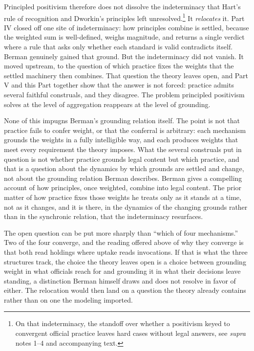 Principled positivism therefore does not dissolve the indeterminacy that
Hart's rule of recognition and Dworkin's principles left unresolved.\footnote{On that indeterminacy, the standoff over whether a positivism keyed to convergent official practice leaves hard cases without legal answers, see \textit{supra} notes 1--4 and accompanying text.} It
\textit{relocates} it. Part IV closed off one site of indeterminacy: how
principles combine is settled, because the weighted sum is well-defined,
weighs magnitude, and returns a single verdict where a rule that asks
only whether each standard is valid contradicts itself. Berman genuinely
gained that ground. But the indeterminacy did not vanish. It moved upstream, to the question of
which practice fixes the weights that the settled machinery then combines. That
question the theory leaves open, and Part V and this Part together show
that the answer is not forced: practice admits several faithful
construals, and they disagree. The problem principled positivism solves at the level of aggregation
reappears at the level of grounding.

None of this impugns Berman's grounding relation itself. The point is not
that practice fails to confer weight, or that the conferral is arbitrary:
each mechanism grounds the weights in a fully intelligible way, and each
produces weights that meet every requirement the theory imposes. What the
several construals put in question is not whether practice grounds legal
content but which practice, and that is a question about the dynamics by
which grounds are settled and change, not about the grounding relation
Berman describes. Berman gives a compelling account of how principles,
once weighted, combine into legal content. The prior matter of how practice fixes those weights he treats only as it
stands at a time, not as it changes, and it is there, in the dynamics of the changing grounds rather than
in the synchronic relation, that the indeterminacy resurfaces.

The open question can be put more sharply than ``which of four
mechanisms.'' Two of the four converge, and the reading offered above of why they
converge is that both read holdings where uptake reads invocations.
If that is what the three structures track, the choice the theory leaves
open is a choice between grounding weight in what officials reach for and
grounding it in what their decisions leave standing, a distinction Berman
himself draws and does not resolve in favor of either. The relocation would then land on a question the theory already contains
rather than on one the modeling imported.

